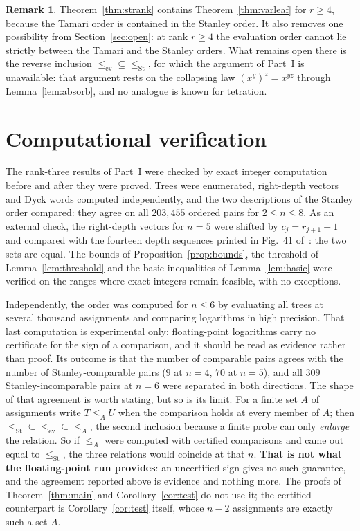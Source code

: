 \documentclass[11pt,a4paper]{article}
\theoremstyle{plain}
\theoremstyle{definition}
\newtheorem{remark}[theorem]{Remark}
\newcommand{\ev}{\mathrm{ev}}
\newcommand{\St}{\mathrm{St}}
\begin{document}
\begin{remark}\label{rem:strankcontains}
Theorem~\ref{thm:strank} contains Theorem~\ref{thm:varleaf} for $r\ge4$, because the
Tamari order is contained in the Stanley order. It also removes one possibility from
Section~\ref{sec:open}: at rank $r\ge4$ the evaluation order cannot lie strictly between
the Tamari and the Stanley orders. What remains open there is the reverse inclusion
$\le_{\ev}\subseteq\le_{\St}$, for which the argument of Part~I is unavailable: that
argument rests on the collapsing law $(x^{y})^{z}=x^{yz}$ through
Lemma~\ref{lem:absorb}, and no analogue is known for tetration.
\end{remark}

\section{Computational verification}\label{sec:comp}

The rank-three results of Part~I were checked by exact integer computation before and
after they were proved. Trees were enumerated, right-depth vectors and Dyck words computed
independently, and the two descriptions of the Stanley order compared: they agree on all
$203{,}455$ ordered pairs for $2\le n\le8$. As an external check, the right-depth vectors for $n=5$
were shifted by $c_j=r_{j+1}-1$ and compared with the fourteen depth sequences printed
in Fig.~41 of~\cite{Knuth}: the two sets are equal. The bounds of
Proposition~\ref{prop:bounds}, the threshold of Lemma~\ref{lem:threshold} and the basic
inequalities of Lemma~\ref{lem:basic} were verified on the ranges where exact integers
remain feasible, with no exceptions.

Independently, the order was computed for $n\le6$ by evaluating all trees at several
thousand assignments and comparing logarithms in high precision. That last computation
is experimental only: floating-point logarithms carry no certificate for the sign of a
comparison, and it should be read as evidence rather than proof. Its outcome is that
the number of comparable pairs agrees with the number of Stanley-comparable pairs ($9$ at $n=4$, $70$ at $n=5$),
and all $309$ Stanley-incomparable pairs at $n=6$ were separated in both directions.
The shape of that agreement is worth stating, but so is its limit. For a finite set $A$
of assignments write $T\le_A U$ when the comparison holds at every member of $A$; then
$\le_{\St}\subseteq\le_{\ev}\subseteq\le_A$, the second inclusion because a finite
probe can only \emph{enlarge} the relation. So if $\le_A$ were computed with certified
comparisons and came out equal to $\le_{\St}$, the three relations would coincide at that
$n$. \textbf{That is not what the floating-point run provides}: an uncertified sign gives
no such guarantee, and the agreement reported above is evidence and nothing more. The
proofs of Theorem~\ref{thm:main} and Corollary~\ref{cor:test} do not use it; the
certified counterpart is Corollary~\ref{cor:test} itself, whose $n-2$ assignments are
exactly such a set $A$.
\end{document}
